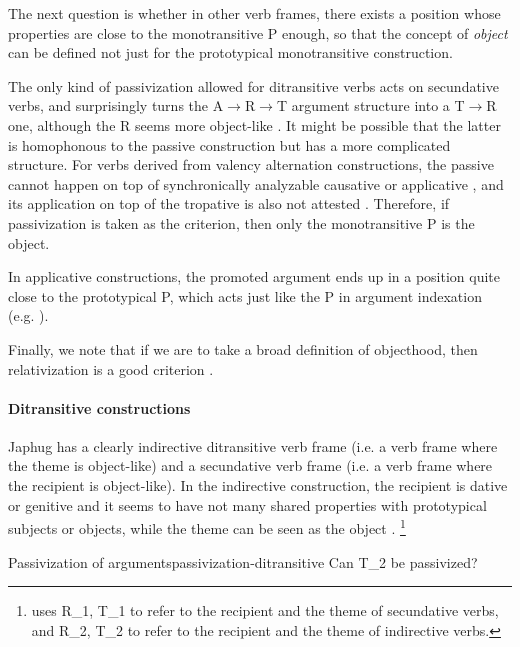 \documentclass[a4paper, oneside, 12pt]{report}
\newcommand*{\textto}{$\to$}
\newcommand*{\citesec}[1]{\S~{#1}}
\newcommand*{\citepage}[1]{p.~{#1}}
\newcommand*{\term}[1]{\emph{#1}}
\begin{document}
The next question is whether in other verb frames,
there exists a position whose properties are close to the monotransitive P enough,
so that the concept of \term{object} can be defined not just for 
the prototypical monotransitive construction. 

The only kind of passivization allowed for ditransitive verbs
acts on secundative verbs,
and surprisingly turns the A\textto R\textto T argument structure
into a T\textto R one, although the R seems more object-like
\citep[\citepage{884}]{jacques2021grammar}.
It might be possible that the latter is homophonous to the passive construction
but has a more complicated structure.
For verbs derived from valency alternation constructions,
the passive cannot happen on top of synchronically analyzable causative or applicative 
\citep[\citepage{885}]{jacques2021grammar},
and its application on top of the tropative is also not attested
\citep[\citesec{17.5.4}]{jacques2021grammar}.
Therefore, if passivization is taken as the criterion,
then only the monotransitive P is the object.

In applicative constructions,
the promoted argument ends up in a position quite close to the prototypical P,
which acts just like the P in argument indexation
(e.g. \citealt[\citepage{863}, (102)]{jacques2021grammar}).

Finally, we note that if we are to take a broad definition of objecthood,
then relativization is a good criterion 
\citep{jacques2016subjects}.

\paragraph*{Ditransitive constructions}
Japhug has a clearly indirective ditransitive verb frame
(i.e. a verb frame where the theme is object-like)
and a secundative verb frame  
(i.e. a verb frame where the recipient is object-like).
In the indirective construction,
the recipient is dative or genitive \citep[\citesec{14.4.1}]{jacques2021grammar}
and it seems to have not many shared properties with prototypical subjects or objects,
while the theme can be seen as the object \citep{jacques2016subjects}.%
\footnote{
    \citet{jacques2016subjects} 
    uses R_1, T_1 to refer to the recipient and the theme of secundative verbs,
    and R_2, T_2 to refer to the recipient and the theme of indirective verbs. 
}

\begin{todobox}{Passivization of arguments}{passivization-ditransitive}
    Can T_2 be passivized?
\end{todobox}
\end{document}
